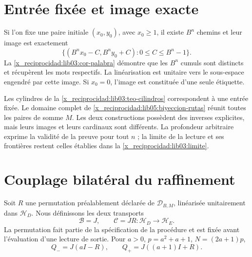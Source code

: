 \section{Entrée fixée et image exacte}
\label{x_reciprocidad:lib05:entrada-fija}

Si l'on fixe une paire initiale \((x_0,y_0)\), avec \(x_0\geq1\), il existe \(B^n\) chemins et leur image est exactement
\begin{equation}
 \bigl\{(B^nx_0-C,B^ny_0+C):0\leq C\leq B^n-1\bigr\}.
 \label{x_reciprocidad:lib05:imagen-fija}
\end{equation}
La \cref{x_reciprocidad:lib03:cor-palabra} démontre que les \(B^n\) cumuls sont distincts et récupèrent les mots respectifs. La linéarisation est unitaire vers le sous-espace engendré par cette image. Si \(x_0=0\), l'image est constituée d'une seule étiquette.

Les cylindres de la \cref{x_reciprocidad:lib03:teo-cilindros} correspondent à une
entrée fixée. Le domaine complet de
\eqref{x_reciprocidad:lib05:biyeccion-rutas} réunit toutes les paires de somme \(M\).
Les deux constructions possèdent des inverses explicites, mais leurs images
et leurs cardinaux sont différents. La profondeur arbitraire exprime la
validité de la preuve pour tout \(n\) ; la limite de la lecture et
ses frontières restent celles établies dans la
\cref{x_reciprocidad:lib03:limite}.

\section{Couplage bilatéral du raffinement}
\label{x_reciprocidad:lib05:bilateral}

Soit \(R\) une permutation préalablement déclarée de
\(\mathcal D_{B,M}\), linéarisée unitairement dans
\(\mathscr H_D\). Nous définissons les deux transports
\begin{equation}
 \mathcal B=J,\qquad \mathcal C=JR:
            \mathscr H_D\longrightarrow\mathscr H_E.
 \label{x_reciprocidad:lib05:dos-transportes}
\end{equation}
La permutation fait partie de la spécification de la procédure et est fixée avant l'évaluation d'une lecture de sortie. Pour \(a>0\), \(p=a^2+a+1\), \(N=(2a+1)p\),
\begin{equation}
 Q_-=J(aI-R),\qquad Q_+=J((a+1)I+R).
 \label{x_reciprocidad:lib05:q-refinamiento}
\end{equation}

